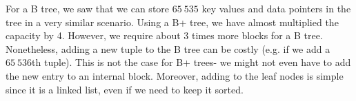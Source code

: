 \documentclass[a4paper, openany]{memoir}
\begin{document}

For a B tree, we saw that we can store $65 \ 535$ key values and data pointers in the tree in a very similar scenario. Using a B+ tree, we have almost multiplied the capacity by 4. However, we require about 3 times more blocks for a B tree. Nonetheless, adding a new tuple to the B tree can be costly (e.g. if we add a $65 \ 536$th tuple). This is not the case for B+ trees- we might not even have to add the new entry to an internal block. Moreover, adding to the leaf nodes is simple since it is a linked list, even if we need to keep it sorted.

    
\end{document}
